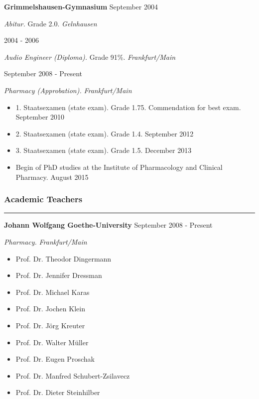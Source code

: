 {\bf Grimmelshausen-Gymnasium} \hfill September 2004

\emph{Abitur.} Grade 2.0. \hfill \emph{Gelnhausen} \medskip

 \hfill 2004 - 2006

\emph{Audio Engineer (Diploma).} Grade 91\%. \hfill \emph{Frankfurt/Main} \medskip

 \hfill September 2008 - Present

\emph{Pharmacy (Approbation).} \hfill \emph{Frankfurt/Main}
\vspace{-10pt}
\begin{itemize}[noitemsep, leftmargin=.5cm, label={\tiny\raisebox{.5ex}{\textbullet}}]
\item 1. Staatsexamen (state exam). Grade 1.75. Commendation for best exam. \hfill September 2010
\item 2. Staatsexamen (state exam). Grade 1.4. \hfill September 2012
\item 3. Staatsexamen (state exam). Grade 1.5. \hfill December 2013
\item Begin of PhD studies at the Institute of Pharmacology and Clinical Pharmacy. \hfill August 2015
\end{itemize}

\subsubsection{\textbf{Academic Teachers}}
\vspace{-8pt}
\hrule
\vspace{10pt}

{\bf Johann Wolfgang Goethe-University} \hfill September 2008 - Present

\emph{Pharmacy.} \hfill \emph{Frankfurt/Main}
\vspace{-10pt}
\begin{itemize}[noitemsep, leftmargin=.5cm, label={\tiny\raisebox{.5ex}{\textbullet}}]
\item Prof. Dr. Theodor Dingermann
\item Prof. Dr. Jennifer Dressman
\item Prof. Dr. Michael Karas
\item Prof. Dr. Jochen Klein
\item Prof. Dr. Jörg Kreuter
\item Prof. Dr. Walter Müller
\item Prof. Dr. Eugen Proschak
\item Prof. Dr. Manfred Schubert-Zsilavecz
\item Prof. Dr. Dieter Steinhilber
\end{itemize}


